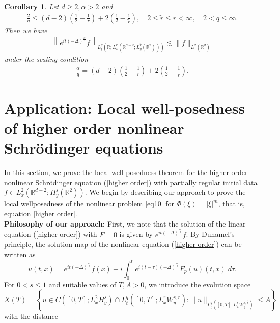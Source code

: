 \documentclass[a4paper,11pt, reqno]{amsart}
\newtheorem{cor}[theorem]{Corollary}
\theoremstyle{definition}
\theoremstyle{remark}
\numberwithin{equation}{section}
\begin{document}
			
			 
					
				 
	
 
	\begin{cor} Let $d \geq 2, \alpha >2$ and  
    \begin{align}\label{a}
			\frac{2}{q} \leq(d-2)\left(\frac{1}{2}-\frac{1}{r}\right)+2\left(\frac{1}{2}-\frac{1}{\widetilde{r}}\right), \quad 2 \leq \widetilde{r} \leq r<\infty, \quad 2<q \leq \infty.
		\end{align}
        Then we have 
		\begin{align*}
			\left\|e^{i t (-\Delta)^{\frac{\alpha}{2}}}  f\right\|_{L_t^q\left(\mathbb{R} ; L_x^r\left(\mathbb{R}^{d-2} ; L_y^{\tilde{r}}\left(\mathbb{R}^2\right)\right)\right)} \lesssim\|f\|_{L^2(\mathbb{R}^{d})}
		\end{align*}
		under  the scaling condition
		\begin{align*}
			\frac{{{\alpha}}}{q}=(d-2)\left(\frac{1}{2}-\frac{1}{r}\right)+2\left(\frac{1}{2}-\frac{1}{\widetilde{r}}\right).
		\end{align*}
		\end{cor}
	
	\section{Application: Local well-posedness of higher order nonlinear Schr\"odinger equations}\label{sec4}
	In this section, we prove the local well-posedness theorem for the higher order nonlinear Schr\"odinger equation (\ref{higher order}) with partially regular initial data $f \in L_x^2\left(\mathbb{R}^{d-2} ; H_y^s\left(\mathbb{R}^2\right)\right)$. We begin by describing our approach to prove the local wellposedness  of the nonlinear problem \eqref{eq10} for $\Phi(\xi)=|\xi|^m$, that is, equation \eqref{higher order}. \\
	 
	\textbf{Philosophy of our approach:} First, we note that the solution of the linear equation (\ref{higher order}) with $F=0$ is given by $e^{i t(-\Delta)^{\frac{m}{2}} } f$. By Duhamel's principle, the solution map of the nonlinear equation  (\ref{higher order})   can be written as 
	$$
	u(t, x)=e^{i t (-\Delta)^{\frac{m}{2}}} f(x)-i \int_0^t e^{i(t-\tau)(-\Delta)^{\frac{m}{2}}} F_p(u)(t, x)\; d \tau. 
	$$ 
	For $0<s \leq 1$ and suitable values of $T, A>0$, we introduce the evolution space 
	\begin{equation} \label{evospace}
	    X(T)=\left\{u \in C\left([0, T] ; L_x^2 H_y^s\right) \cap L_t^q\left([0, T] ; L_x^r W_y^{s, \widetilde{r}}\right):  \|u\|_{L_t^q\left([0, T] ; L_x^r W_y^{s, \tilde{r}}\right)} \leq A\right\}
	\end{equation} with the distance
	
\end{document}
